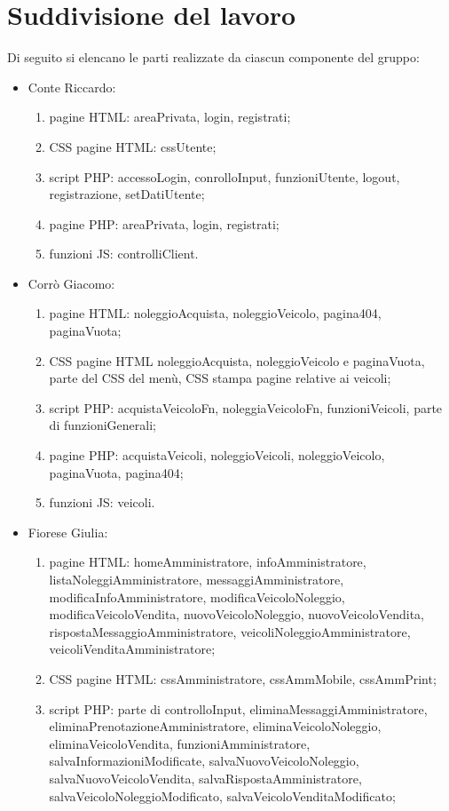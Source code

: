 \section{Suddivisione del lavoro}
Di seguito si elencano le parti realizzate da ciascun componente del gruppo:
\begin{itemize}
    \item Conte Riccardo:
        \begin{enumerate}
        \item pagine HTML: areaPrivata, login, registrati;
        \item CSS pagine HTML: cssUtente;
        \item script PHP: accessoLogin, conrolloInput, funzioniUtente, logout, registrazione, setDatiUtente;
        \item pagine PHP: areaPrivata, login, registrati;
        \item funzioni JS: controlliClient.
        \end{enumerate}
    \item Corrò Giacomo:
        \begin{enumerate}
            \item pagine HTML: noleggioAcquista, noleggioVeicolo, pagina404, paginaVuota;
            \item CSS pagine HTML noleggioAcquista, noleggioVeicolo e paginaVuota, parte del CSS del menù, CSS stampa pagine relative ai veicoli;
            \item script PHP: acquistaVeicoloFn, noleggiaVeicoloFn, funzioniVeicoli, parte di funzioniGenerali;
            \item pagine PHP: acquistaVeicoli, noleggioVeicoli, noleggioVeicolo, paginaVuota, pagina404;
            \item funzioni JS: veicoli.
        \end{enumerate}
    \item Fiorese Giulia:
        \begin{enumerate}
            \item pagine HTML: homeAmministratore, infoAmministratore, listaNoleggiAmministratore, messaggiAmministratore, modificaInfoAmministratore, modificaVeicoloNoleggio, modificaVeicoloVendita, nuovoVeicoloNoleggio, nuovoVeicoloVendita, rispostaMessaggioAmministratore, veicoliNoleggioAmministratore, veicoliVenditaAmministratore;
            \item CSS pagine HTML: cssAmministratore, cssAmmMobile, cssAmmPrint;
            \item script PHP: parte di controlloInput, eliminaMessaggiAmministratore, eliminaPrenotazioneAmministratore, eliminaVeicoloNoleggio, eliminaVeicoloVendita, funzioniAmministratore, salvaInformazioniModificate, salvaNuovoVeicoloNoleggio, salvaNuovoVeicoloVendita, salvaRispostaAmministratore, salvaVeicoloNoleggioModificato, salvaVeicoloVenditaModificato;

\end{enumerate}
\end{itemize}
